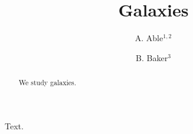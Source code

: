 
\title{Galaxies}
\author{A. Able$^{1,2}$ \and B. Baker$^{3}$}
\maketitle
\begin{abstract}
We study galaxies.
\end{abstract}
Text.

